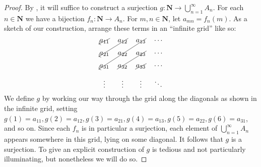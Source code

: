 \documentclass[12pt]{article}
\theoremstyle{definition}
\newcommand{\N}{\mathbf{N}}
\begin{document}
\begin{proof}
    By , it will suffice to construct a surjection \( g : \N \to \bigcup_{n=1}^{\infty} A_n \). For each \( n \in \N \) we have a bijection \( f_n : \N \to A_n \). For \( m, n \in \N \), let \( a_{mn} = f_n(m) \). As a sketch of our construction, arrange these terms in an ``infinite grid'' like so:
    \[
        \begin{tikzpicture}
            \matrix[matrix of math nodes,inner sep=1pt,row sep=1em,column sep=1em] (M)
            {
                a_{11} & a_{12} & a_{13} & \cdots \\
                a_{21} & a_{22} & a_{23} & \cdots \\
                a_{31} & a_{32} & a_{33} & \cdots \\
                \vdots & \vdots & \vdots & \ddots \\
            }
            ;
            \draw[->] (M-1-1.north east) -- (M-1-1.south west);
            \draw[->] (M-1-2.north east) -- (M-2-1.south west);
            \draw[->] (M-1-3.north east) -- (M-3-1.south west);
            \draw[-] (M-2-3.north east) -- (M-3-2.south west);
            \draw[-] (M-3-3.north east) -- (M-3-3.south west);
        \end{tikzpicture}
    \]
    We define \( g \) by working our way through the grid along the diagonals as shown in the infinite grid, setting \( g(1) = a_{11}, g(2) = a_{12}, g(3) = a_{21}, g(4) = a_{13}, g(5) = a_{22}, g(6) = a_{31} \), and so on. Since each \( f_n \) is in particular a surjection, each element of \( \bigcup_{n=1}^{\infty} A_n \) appears somewhere in this grid, lying on some diagonal. It follows that \( g \) is a surjection. To give an explicit construction of \( g \) is tedious and not particularly illuminating, but nonetheless we will do so.

    \vspace{2mm}


\end{proof}
\end{document}

